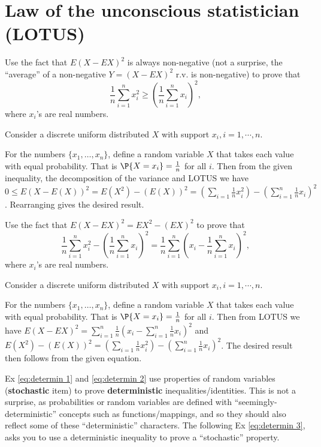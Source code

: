 \section{Law of the unconscious statistician (LOTUS)}
\label{sec:section-4.7}

 \begin{exercise}\label{eq:determin 1}
 	Use the fact that $E(X-EX)^2$ is always non-negative (not a surprise, the ``average'' of a non-negative $Y=(X-EX)^2$ r.v. is non-negative) to prove that 
 	$$\frac{1}{n}\sum_{i=1}^n x_i^2 \geq \left(\frac{1}{n}\sum_{i=1}^n x_i \right)^2,$$
 	where $x_i$'s are real numbers.
	\begin{hint}
		Consider a discrete uniform distributed $X$ with support $x_i, i=1,\cdots, n$.
	\end{hint}
	\begin{solution}
		For the numbers $\{x_1,\dots,x_n\}$, define a random variable $X$ that takes each value with equal probability. That is $\P{X=x_i}=\frac{1}{n}$ for all $i$. Then from the given inequality, the decomposition of the variance and LOTUS we have $0\leq E(X-E(X))^2=E(X^2)-(E(X))^2=\left(\sum_{i=1}\frac{1}{n}x_i^2\right)- \left(\sum_{i=1}^n\frac{1}{n}x_i\right)^2$. Rearranging gives the desired result.
	\end{solution}
\end{exercise}

 \begin{exercise}\label{eq:determin 2}
	Use the fact that $E(X-EX)^2=EX^2-(EX)^2$ to prove that 
	$$\frac{1}{n}\sum_{i=1}^n x_i^2 - \left(\frac{1}{n}\sum_{i=1}^n x_i \right)^2=\frac{1}{n}\sum_{i=1}^n\left(x_i- \frac{1}{n}\sum_{i=1}^n x_i \right)^2,$$
	where $x_i$'s are real numbers.
	\begin{hint}
		Consider a discrete uniform distributed $X$ with support $x_i, i=1,\cdots, n$.
	\end{hint}
	\begin{solution} 
		For the numbers $\{x_1,\dots,x_n\}$, define a random variable $X$ that takes each value with equal probability. That is $\P{X=x_i}=\frac{1}{n}$ for all $i$. Then from LOTUS we have $E(X-EX)^2=\sum_{i=1}^n\frac{1}{n}(x_i-\sum_{i=1}^n\frac{1}{n}x_i)^2$ and $E(X^2)-(E(X))^2=\left(\sum_{i=1}\frac{1}{n}x_i^2\right)- \left(\sum_{i=1}^n\frac{1}{n}x_i\right)^2$. The desired result then follows from the given equation.
	\end{solution}
\end{exercise}
\begin{remark}
	Ex \ref{eq:determin 1} and \ref{eq:determin 2} use properties of random variables (\textbf{stochastic} item) to prove \textbf{deterministic} inequalities/identities. This is not a surprise, as probabilities or random variables are defined with ``seemingly-deterministic'' concepts such as functions/mappings, and so they should also reflect some of these ``deterministic'' characters. The following Ex \ref{eq:determin 3}, asks you to use a deterministic inequality to prove a ``stochastic'' property.
\end{remark}


